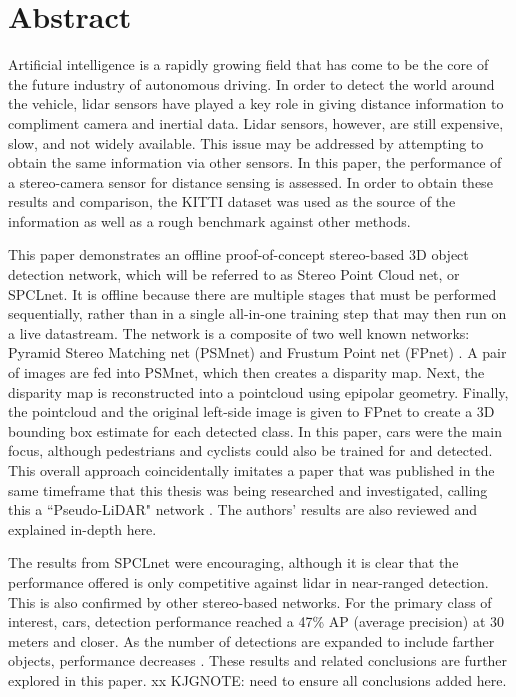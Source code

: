 \section*{Abstract} %

Artificial intelligence is a rapidly growing field that has come to be the core of the future industry of autonomous driving. In order to detect the world around the vehicle, lidar sensors have played a key role in giving distance information to compliment camera and inertial data. Lidar sensors, however, are still expensive, slow, and not widely available. This issue may be addressed by attempting to obtain the same information via other sensors. In this paper, the performance of a stereo-camera sensor for distance sensing is assessed. In order to obtain these results and comparison, the KITTI dataset was used as the source of the information as well as a rough benchmark against other methods. 

This paper demonstrates an offline proof-of-concept stereo-based 3D object detection network, which will be referred to as Stereo Point Cloud net, or SPCLnet. It is offline because there are multiple stages that must be performed sequentially, rather than in a single all-in-one training step that may then run on a live datastream. The network is a composite of two well known networks: Pyramid Stereo Matching net (PSMnet) \cite{chang_pyramid_2018} and Frustum Point net (FPnet) \cite{qi_frustum_2017}. A pair of images are fed into PSMnet, which then creates a disparity map. Next, the disparity map is reconstructed into a pointcloud using epipolar geometry. Finally, the pointcloud and the original left-side image is given to FPnet to create a 3D bounding box estimate for each detected class. In this paper, cars were the main focus, although pedestrians and cyclists could also be trained for and detected. This overall approach coincidentally imitates a paper that was published in the same timeframe that this thesis was being researched and investigated, calling this a ``Pseudo-LiDAR" network \cite{wang_pseudo-lidar_2019}. The authors' results are also reviewed and explained in-depth here.

The results from SPCLnet were encouraging, although it is clear that the performance offered is only competitive against lidar in near-ranged detection. This is also confirmed by other stereo-based networks. For the primary class of interest, cars, detection performance reached a 47\% AP (average precision) at 30 meters and closer. As the number of detections are expanded to include farther objects, performance decreases \cite{wang_pseudo-lidar_2019}. These results and related conclusions are further explored in this paper.
xx KJGNOTE: need to ensure all conclusions added here.

